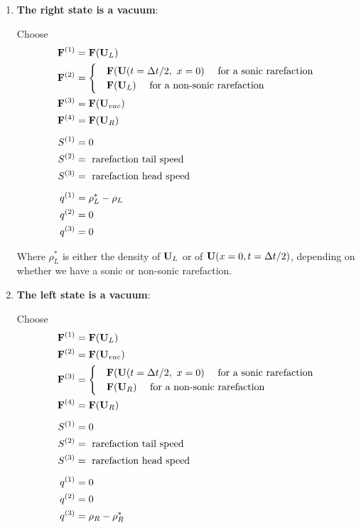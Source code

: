 \begin{enumerate}

	\item 	\textbf{The right state is a vacuum}:
	
			Choose 
			\begin{align*}
				\mathbf{F}^{(1)} &= \mathbf{F}(\mathbf{U}_L)\\
				\mathbf{F}^{(2)} &= \begin{cases}
								&\mathbf{F}(\mathbf{U}(t = \Delta t/2, \ x = 0) \quad \text{ for a sonic rarefaction } \\
								&\mathbf{F}(\mathbf{U}_L) \quad \text{ for a non-sonic rarefaction } \\
							\end{cases}\\
				\mathbf{F}^{(3)} &= \mathbf{F}(\mathbf{U}_{vac})\\
				\mathbf{F}^{(4)} &= \mathbf{F}(\mathbf{U}_R)\\[.5em]
				S^{(1)} &= 0\\
				S^{(2)} &= \text{ rarefaction tail speed}\\
				S^{(3)} &= \text{ rarefaction head speed}\\[.5em]
				q^{(1)} &= \rho^*_L - \rho_L\\
				q^{(2)} &= 0\\
				q^{(3)} &= 0\\							
			\end{align*}
			
			Where $\rho^*_L$ is either the density of $\mathbf{U}_L$ or of $\mathbf{U}(x = 0, t = \Delta t/2)$, depending on whether we have a sonic or non-sonic rarefaction.

	
	\item 	\textbf{The left state is a vacuum}:
			
			Choose 
			\begin{align*}
				\mathbf{F}^{(1)} &= \mathbf{F}(\mathbf{U}_L)\\
				\mathbf{F}^{(2)} &= \mathbf{F}(\mathbf{U}_{vac})\\
				\mathbf{F}^{(3)} &= \begin{cases}
								&\mathbf{F}(\mathbf{U}(t = \Delta t/2, \ x = 0) \quad \text{ for a sonic rarefaction } \\
								&\mathbf{F}(\mathbf{U}_R) \quad \text{ for a non-sonic rarefaction } \\
							\end{cases}\\
				\mathbf{F}^{(4)} &= \mathbf{F}(\mathbf{U}_R)\\[.5em]
				S^{(1)} &= 0\\
				S^{(2)} &= \text{ rarefaction tail speed}\\
				S^{(3)} &= \text{ rarefaction head speed}\\[.5em]
				q^{(1)} &= 0\\
				q^{(2)} &= 0\\
				q^{(3)} &= \rho_R - \rho_R^*\\							
			\end{align*}
			

\end{enumerate}
